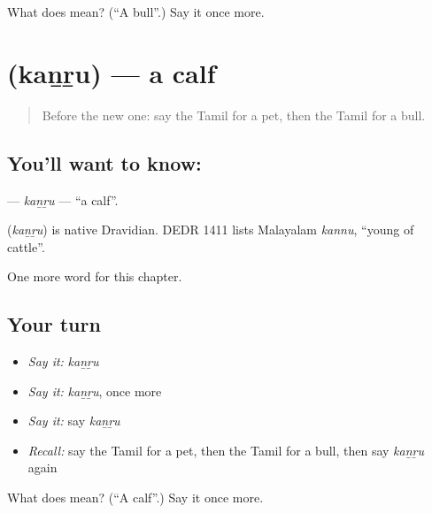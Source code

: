 \begin{tcolorbox}[breakable,colback=teal!4,colframe=teal!35!black,title={Before you move on}]
What does  mean? (\textquotedblleft{}A bull\textquotedblright{}.) Say it once more.
\end{tcolorbox}
\section[\texorpdfstring{\ta{கன்று} (kaṉṟu)}{கன்று (kaṉṟu)}]{ (kaṉṟu) — a calf}

\label{lesson:TA-C187-kanru}



\begin{quote}
Before the new one: say the Tamil for a pet, then the Tamil for a bull.
\end{quote}

\subsection*{You'll want to know: }
\textbf{} — \emph{kaṉṟu} — \textquotedblleft{}a calf\textquotedblright{}.

\begin{cousinweb}
\textbf{} (\emph{kaṉṟu}) is native Dravidian. DEDR 1411 lists Malayalam \emph{kannu}, \textquotedblleft{}young of cattle\textquotedblright{}.
\end{cousinweb}

\begin{grammarlens}[title={What you've built}]
One more word for this chapter.
\end{grammarlens}

\subsection*{Your turn}
\begin{itemize}
\raggedright
  \item \emph{Say it:} \emph{kaṉṟu}
  \item \emph{Say it:} \emph{kaṉṟu}, once more
  \item \emph{Say it:} say \emph{kaṉṟu}
  \item \emph{Recall:} say the Tamil for a pet, then the Tamil for a bull, then say \emph{kaṉṟu} again
\end{itemize}

\begin{tcolorbox}[breakable,colback=teal!4,colframe=teal!35!black,title={Before you move on}]
What does  mean? (\textquotedblleft{}A calf\textquotedblright{}.) Say it once more.
\end{tcolorbox}
